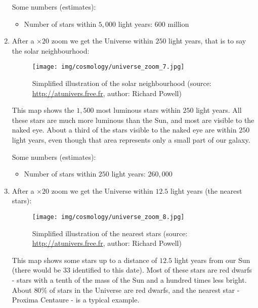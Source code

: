 \begin{enumerate}
		Some numbers (estimates):
		\begin{itemize}
			\item Number of stars within $5,000$ light years: $600$ million
		\end{itemize}
		
		\item After a $\times 20$ zoom we get the Universe within $250$ light years, that is to say the solar neighbourhood:
		\begin{figure}[H]
			\centering
			\texttt{[image: img/cosmology/universe\_zoom\_7.jpg]}
			\caption[Simplified illustration of the solar neighbourhood]{Simplified illustration of the solar neighbourhood (source: \url{http://atunivers.free.fr}, author: Richard Powell)}
		\end{figure}
		This map shows the $1,500$ most luminous stars within $250$ light years. All these stars are much more luminous than the Sun, and most are visible to the naked eye. About a third of the stars visible to the naked eye are within $250$ light years, even though that area represents only a small part of our galaxy.
		
		Some numbers (estimates):
		\begin{itemize}
			\item Number of stars within $250$ light years: $260,000$
		\end{itemize}
		
		\item After a $\times 20$ zoom we get the Universe within $12.5$ light years (the nearest stars):
		\begin{figure}[H]
			\centering
			\texttt{[image: img/cosmology/universe\_zoom\_8.jpg]}
			\caption[Simplified illustration of the nearest stars]{Simplified illustration of the nearest stars (source: \url{http://atunivers.free.fr}, author: Richard Powell)}
		\end{figure}
		This map shows some stars up to a distance of $12.5$ light years from our Sun (there would be $33$ identified to this date). Most of these stars are red dwarfs - stars with a tenth of the mass of the Sun and a hundred times less bright. About $80\%$ of stars in the Universe are red dwarfs, and the nearest star - Proxima Centaure - is a typical example.
		

\end{enumerate}
